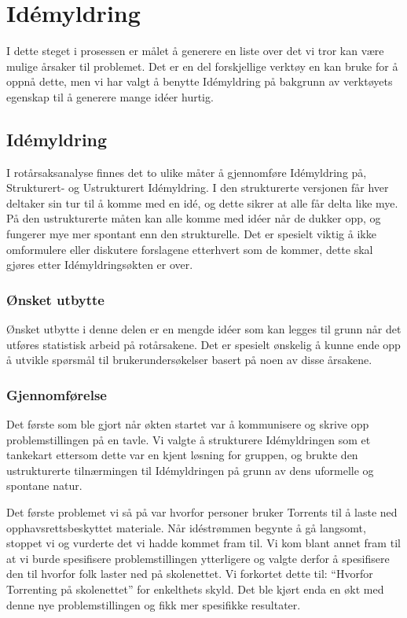 \chapter{Idémyldring}
I dette steget i prosessen er målet å generere en liste over det vi tror kan være mulige årsaker til problemet. Det er en del forskjellige verktøy en kan bruke for å oppnå dette, men vi har valgt å benytte Idémyldring på bakgrunn av verktøyets egenskap til å generere mange idéer hurtig.

\section{Idémyldring}
I rotårsaksanalyse finnes det to ulike måter å gjennomføre Idémyldring på, Strukturert- og Ustrukturert Idémyldring. I den strukturerte versjonen får hver deltaker sin tur til å komme med en idé, og dette sikrer at alle får delta like mye. På den ustrukturerte måten kan alle komme med idéer når de dukker opp, og fungerer mye mer spontant enn den strukturelle. Det er spesielt viktig å ikke omformulere eller diskutere forslagene etterhvert som de kommer, dette skal gjøres etter Idémyldringsøkten er over.

\subsection{Ønsket utbytte}
Ønsket utbytte i denne delen er en mengde idéer som kan legges til grunn når det utføres statistisk arbeid på rotårsakene. Det er spesielt ønskelig å kunne ende opp å utvikle spørsmål til brukerundersøkelser basert på noen av disse årsakene.

\subsection{Gjennomførelse}
Det første som ble gjort når økten startet var å kommunisere og skrive opp problemstillingen på en tavle. Vi valgte å strukturere Idémyldringen som et tankekart ettersom dette var en kjent løsning for gruppen, og brukte den ustrukturerte tilnærmingen til Idémyldringen på grunn av dens uformelle og spontane natur. 

Det første problemet vi så på var hvorfor personer bruker Torrents til å laste ned opphavsrettsbeskyttet materiale. Når idéstrømmen begynte å gå langsomt, stoppet vi og vurderte det vi hadde kommet fram til. Vi kom blant annet fram til at vi burde spesifisere problemstillingen ytterligere og valgte derfor å spesifisere den til hvorfor folk laster ned på skolenettet. Vi forkortet dette til: ``Hvorfor Torrenting på skolenettet'' for enkelthets skyld. Det ble kjørt enda en økt med denne nye problemstillingen og fikk mer spesifikke resultater. 

